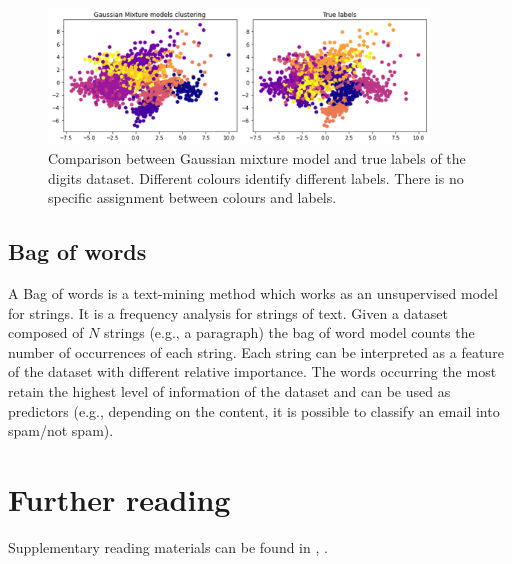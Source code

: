 \begin{figure}[hbt!]
\centering
\includegraphics[width=0.9\textwidth]{SectionLetsMath/unsupervisedLearning_figures/fig_gmm.png}
\captionsetup{type=figure}
\caption{Comparison between Gaussian mixture model and true labels of the digits dataset. Different colours identify different labels. There is no specific assignment between colours and labels.}
\label{fig_gmm}
\end{figure}

\subsection{Bag of words} 
A Bag of words is a text-mining method which works as an unsupervised model for strings. It is a frequency analysis for strings of text. Given a dataset composed of $N$ strings (e.g., a paragraph) the bag of word model counts the number of occurrences of each string. Each string can be interpreted as a feature of the dataset with different relative importance. The words occurring the most retain the highest level of information of the dataset and can be used as predictors (e.g., depending on the content, it is possible to classify an email into spam/not spam).



\section*{Further reading}
Supplementary reading materials can be found in \cite{Aggarwal2015}, \cite{Blattberg2008}.






